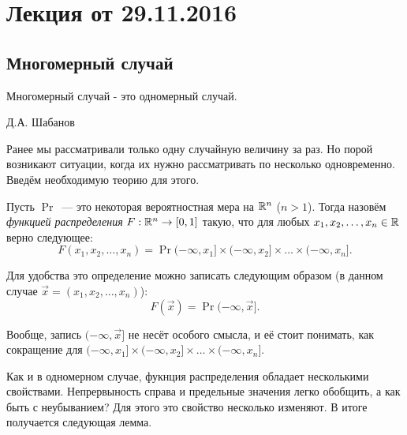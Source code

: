 \section{Лекция от 29.11.2016}
\subsection{Многомерный случай}
\epigraph{Многомерный случай - это одномерный случай.}{Д.А. Шабанов}
Ранее мы рассматривали только одну случайную величину за раз. Но порой возникают ситуации, когда их нужно рассматривать по несколько одновременно. Введём необходимую теорию для этого.

\begin{definition}
	Пусть \(\Pr\)~--- это некоторая вероятностная мера на \(\mathbb{R}^{n}\) (\(n > 1\)). Тогда назовём \emph{функцией распределения} \(F: \mathbb{R}^{n} \to [0, 1]\) такую, что для любых \(x_1, x_2, \dots, x_n \in \mathbb{R}\) верно следующее:
	\[
	F(x_1, x_2, \dots, x_n) = \Pr{(-\infty, x_1] \times (-\infty, x_2] \times \dots \times (-\infty, x_n]}.
	\]
\end{definition}
\begin{remark}
	Для удобства это определение можно записать следующим образом (в данном случае \(\vec{x} = (x_1, x_2, \dots, x_n)\)):
	\[
	F(\vec{x}) = \Pr{(-\infty, \vec{x}]}.
	\]
	
	Вообще, запись \((-\infty, \vec{x}]\) не несёт особого смысла, и её стоит понимать, как сокращение для \((-\infty, x_1] \times (-\infty, x_2] \times \dots \times (-\infty, x_n]\).
\end{remark}

Как и в одномерном случае, фукнция распределения обладает несколькими свойствами. Непрервыность справа и предельные значения легко обобщить, а как быть с неубыванием? Для этого это свойство несколько изменяют. В итоге получается следующая лемма.

